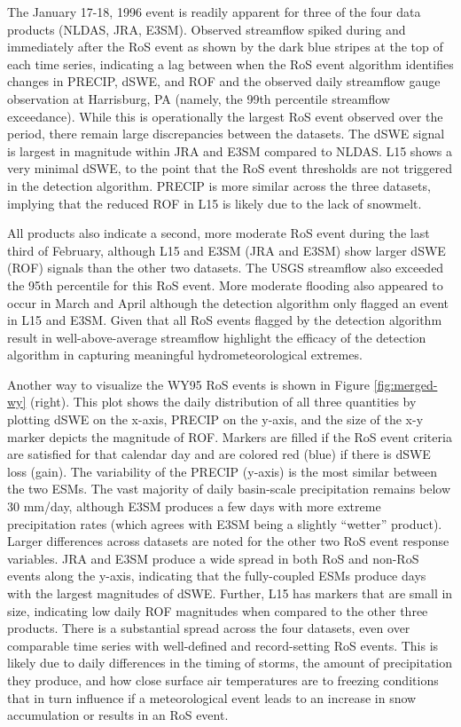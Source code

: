 \documentclass[draft]{agujournal2019}
\begin{document}
The January 17-18, 1996 event is readily apparent for three of the four data products (NLDAS, JRA, E3SM). 
Observed streamflow spiked during and immediately after the RoS event as shown by the dark blue stripes at the top of each time series, indicating a lag between when the RoS event algorithm identifies changes in PRECIP, dSWE, and ROF and the observed daily streamflow gauge observation at Harrisburg, PA (namely, the 99th percentile streamflow exceedance).
While this is operationally the largest RoS event observed over the period, there remain large discrepancies between the datasets. 
The dSWE signal is largest in magnitude within JRA and E3SM compared to NLDAS. 
L15 shows a very minimal dSWE, to the point that the RoS event thresholds are not triggered in the detection algorithm. 
PRECIP is more similar across the three datasets, implying that the reduced ROF in L15 is likely due to the lack of snowmelt.

All products also indicate a second, more moderate RoS event during the last third of February, although L15 and E3SM (JRA and E3SM) show larger dSWE (ROF) signals than the other two datasets. 
The USGS streamflow also exceeded the 95th percentile for this RoS event. 
More moderate flooding also appeared to occur in March and April although the detection algorithm only flagged an event in L15 and E3SM. 
Given that all RoS events flagged by the detection algorithm result in well-above-average streamflow highlight the efficacy of the detection algorithm in capturing meaningful hydrometeorological extremes.

Another way to visualize the WY95 RoS events is shown in Figure \ref{fig:merged-wy} (right).  This plot shows the daily distribution of all three quantities by plotting dSWE on the x-axis, PRECIP on the y-axis, and the size of the x-y marker depicts the magnitude of ROF.
Markers are filled if the RoS event criteria are satisfied for that calendar day and are colored red (blue) if there is dSWE loss (gain). 
The variability of the PRECIP (y-axis) is the most similar between the two ESMs.
The vast majority of daily basin-scale precipitation remains below 30 mm/day, although E3SM produces a few days with more extreme precipitation rates (which agrees with E3SM being a slightly ``wetter'' product). 
Larger differences across datasets are noted for the other two RoS event response variables. 
JRA and E3SM produce a wide spread in both RoS and non-RoS events along the y-axis, indicating that the fully-coupled ESMs produce days with the largest magnitudes of dSWE. 
Further, L15 has markers that are small in size, indicating low daily ROF magnitudes when compared to the other three products.
There is a substantial spread across the four datasets, even over comparable time series with well-defined and record-setting RoS events.
This is likely due to daily differences in the timing of storms, the amount of precipitation they produce, and how close surface air temperatures are to freezing conditions that in turn influence if a meteorological event leads to an increase in snow accumulation or results in an RoS event.
\end{document}
